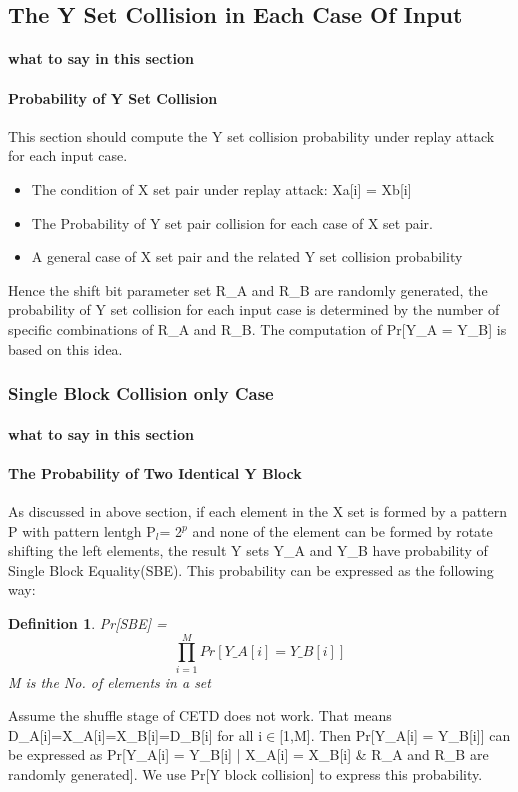 \documentclass{article}
\newtheorem{defination}{Definition}[section]
\begin{document}
\subsection{The Y Set Collision in Each Case Of Input} 
\paragraph{what to say in this section}
\paragraph{Probability of Y Set Collision} 
This section should compute the Y set collision probability
under replay attack for each input case.  
\begin{itemize} 
	\item The condition of X set pair under replay attack: Xa[i] = Xb[i] 
	\item The Probability of Y set pair collision for each case of X set pair.  
	\item A general case of X set pair and the related Y set collision probability 
\end{itemize} 

Hence the shift bit parameter set R\_A and R\_B are randomly generated, the probability of Y set collision for each input case is determined by the number of specific combinations of R\_A and R\_B. The computation of Pr[Y\_A = Y\_B] is based on this idea.

\subsubsection{Single Block Collision only Case}
\paragraph{what to say in this section}
\paragraph{The Probability of Two Identical Y Block}
As discussed in above section, if each element in the X set is formed by a pattern P with pattern lentgh P$_l$= 2$^p$ and none of the element can be formed by rotate shifting the left elements, the result Y sets Y\_A and Y\_B have probability of Single Block Equality(SBE). This probability can be expressed as the following way:
\begin{defination}
Pr[SBE] = $$\prod_{i=1}^M Pr[Y\_A[i] = Y\_B[i]]$$ M is the No. of elements in a set
\end{defination} 
Assume the shuffle stage of CETD does not work. That means D\_A[i]=X\_A[i]=X\_B[i]=D\_B[i] for all i$\in$[1,M]. Then Pr[Y\_A[i] = Y\_B[i]] can be expressed as Pr[Y\_A[i] = Y\_B[i] | X\_A[i] = X\_B[i] \& R\_A and R\_B are randomly generated]. We use Pr[Y block collision] to express this probability. 
\end{document}
